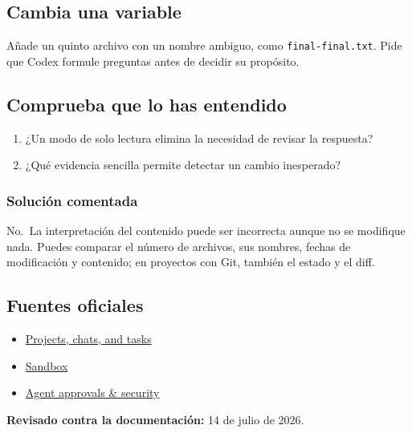 \documentclass[10pt,a4paper,openany]{book}
\providecommand{\tightlist}{\setlength{\itemsep}{0.18em}\setlength{\parskip}{0pt}}
\begin{document}
\subsection{Cambia una variable}\label{cambia-una-variable-3}

Añade un quinto archivo con un nombre ambiguo, como
\texttt{final-final.txt}. Pide que Codex formule preguntas antes de
decidir su propósito.

\subsection{Comprueba que lo has
entendido}\label{comprueba-que-lo-has-entendido-3}

\begin{enumerate}
\def\labelenumi{\arabic{enumi}.}
\tightlist
\item
  ¿Un modo de solo lectura elimina la necesidad de revisar la respuesta?
\item
  ¿Qué evidencia sencilla permite detectar un cambio inesperado?
\end{enumerate}

\subsubsection{Solución comentada}\label{soluciuxf3n-comentada-4}

No.~La interpretación del contenido puede ser incorrecta aunque no se
modifique nada. Puedes comparar el número de archivos, sus nombres,
fechas de modificación y contenido; en proyectos con Git, también el
estado y el diff.

\subsection{Fuentes oficiales}\label{fuentes-oficiales-3}

\begin{itemize}
\tightlist
\item
  \href{https://learn.chatgpt.com/docs/projects}{Projects, chats, and
  tasks}
\item
  \href{https://learn.chatgpt.com/docs/sandboxing}{Sandbox}
\item
  \href{https://learn.chatgpt.com/docs/agent-approvals-security}{Agent
  approvals \& security}
\end{itemize}

\textbf{Revisado contra la documentación:} 14 de julio de 2026.

\clearpage
\end{document}
